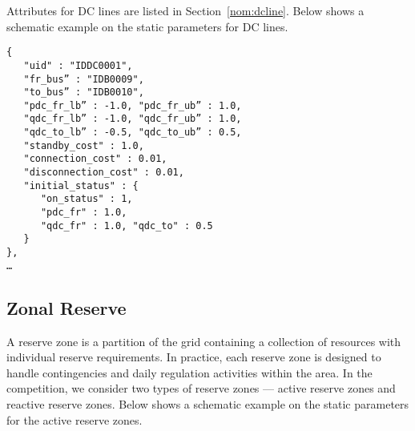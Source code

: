 Attributes for DC lines are listed in Section~\ref{nom:dcline}.
Below shows a schematic example on the static parameters for DC lines.
\begin{verbatim}
{
   "uid" : "IDDC0001",
   "fr_bus” : "IDB0009", 
   "to_bus” : "IDB0010",
   "pdc_fr_lb” : -1.0, "pdc_fr_ub” : 1.0, 
   "qdc_fr_lb” : -1.0, "qdc_fr_ub” : 1.0,
   "qdc_to_lb” : -0.5, "qdc_to_ub” : 0.5,
   "standby_cost" : 1.0,
   "connection_cost" : 0.01,
   "disconnection_cost" : 0.01,
   "initial_status" : {
      "on_status" : 1,
      "pdc_fr" : 1.0, 
      "qdc_fr" : 1.0, "qdc_to" : 0.5 
   }
},
…    
\end{verbatim}



\subsection{Zonal Reserve}
\label{sec:reserve}
A reserve zone is a partition of the grid containing a collection of resources with individual reserve requirements.
In practice, each reserve zone is designed to handle contingencies 
and daily regulation activities within the area.
In the competition, we consider two types of reserve zones --- active reserve zones and reactive reserve zones. 
Below shows a schematic example on the static parameters for the active reserve zones. 

